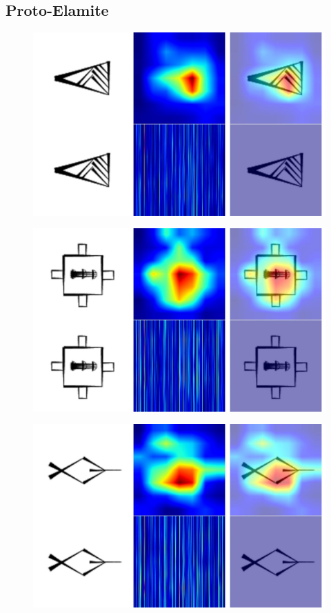 \documentclass[11pt,a4paper,oneside]{report}
\begin{document}
\subsection{Proto-Elamite}
 \begin{figure}[H]
    \centering
    \includegraphics[width=0.9\linewidth]{Visualizations/Grad-CAM/Proto-Elamite/gradcam_M111-N_combined.pdf}
\end{figure}
 \begin{figure}[H]
    \centering
    \includegraphics[width=0.9\linewidth]{Visualizations/Grad-CAM/Proto-Elamite/gradcam_M201+M377_combined.pdf}
\end{figure}
 \begin{figure}[H]
    \centering
    \includegraphics[width=0.9\linewidth]{Visualizations/Grad-CAM/Proto-Elamite/gradcam_M248-CA_combined.pdf}
\end{figure}
\end{document}
